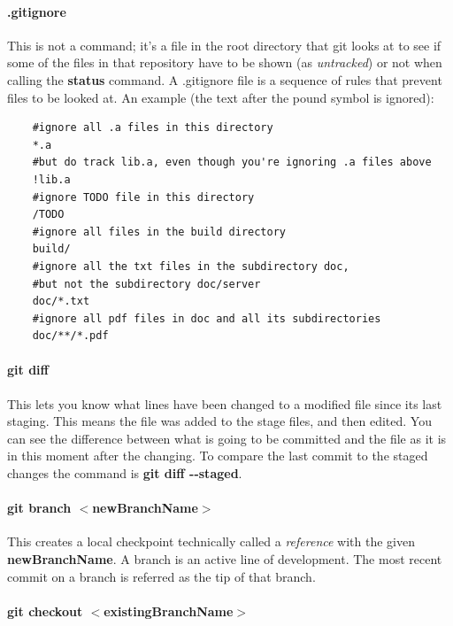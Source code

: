\documentclass[a4paper, 12pt]{article}
\begin{document}
\paragraph{.gitignore}
This is not a command; it's a file in the root directory that git looks at to see if some of the files in that repository have to be shown (as \emph{untracked}) or not when calling the \textbf{status} command. A .gitignore file is a sequence of rules that prevent files to be looked at. An example (the text after the pound symbol is ignored):
\begin{verbatim}
	#ignore all .a files in this directory
	*.a
	#but do track lib.a, even though you're ignoring .a files above
	!lib.a
	#ignore TODO file in this directory
	/TODO
	#ignore all files in the build directory
	build/
	#ignore all the txt files in the subdirectory doc,
	#but not the subdirectory doc/server
	doc/*.txt
	#ignore all pdf files in doc and all its subdirectories
	doc/**/*.pdf	
\end{verbatim}

\paragraph{git diff} This lets you know what lines have been changed to a modified file since its last staging. This means the file was added to the stage files, and then edited. You can see the difference between what is going to be committed and the file as it is in this moment after the changing. To compare the last commit to the staged changes the command is \textbf{git diff -{}-staged}.

\paragraph{git branch $<$newBranchName$>$}
This creates a local checkpoint technically called a \emph{reference} with the given \textbf{newBranchName}. A branch is an active line of development. The most recent commit on a branch is referred as the tip of that branch.

\paragraph{git checkout $<$existingBranchName$>$}
\end{document}
